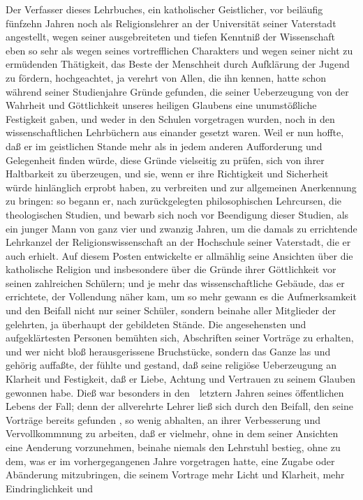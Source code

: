 \def\dieserteilseiten{I}%
\def\dieserteil{I}%
\RWch*{Vorrede.[uns
\RWSeitenwohne{III}\\
{\normalsize \protect\vorredekennzeichnung}}%
%
%
\linenumbers\noindent Der Verfasser dieses Lehrbuches, ein katholischer Geistlicher, vor beiläufig fünfzehn Jahren noch als Religionslehrer an der Universität seiner Vaterstadt angestellt, wegen seiner ausgebreiteten und tiefen Kenntniß der Wissenschaft eben so sehr als wegen seines vortrefflichen Charakters und wegen seiner nicht zu ermüdenden Thätigkeit, das Beste der Menschheit durch Aufklärung der Jugend zu fördern, hochgeachtet, ja verehrt von Allen, die ihn kennen, hatte schon während seiner Studienjahre Gründe gefunden, die seiner Ueberzeugung von der Wahrheit und Göttlichkeit unseres heiligen Glaubens eine unumstößliche Festigkeit gaben, und weder in den Schulen vorgetragen wurden, noch in den wissenschaftlichen Lehrbüchern aus einander gesetzt waren. Weil er nun hoffte, daß er im geistlichen Stande mehr als in jedem anderen Aufforderung und Gelegenheit finden würde, diese Gründe vielseitig zu prüfen, sich von ihrer Haltbarkeit zu überzeugen, und sie, wenn er ihre Richtigkeit und Sicherheit würde hinlänglich erprobt haben, zu verbreiten und zur allgemeinen Anerkennung zu bringen: so begann er, nach zurückgelegten philosophischen Lehrcursen, die theologischen Studien, und bewarb sich noch vor Beendigung dieser Studien, als ein junger Mann von  ganz vier und zwanzig Jahren, um die damals zu errichtende Lehrkanzel der Religionswissenschaft an der Hochschule seiner Vaterstadt, die er auch erhielt. Auf diesem Posten entwickelte er allmählig seine Ansichten über die katholische Religion und insbesondere über die Gründe ihrer Göttlichkeit vor seinen zahlreichen Schülern; und je mehr das wissenschaftliche Gebäude, das er errichtete, der Vollendung näher kam, um so mehr gewann es die Aufmerksamkeit und den Beifall nicht nur seiner Schüler, sondern beinahe aller Mitglieder der gelehrten, ja überhaupt der gebildeten Stände. Die angesehensten und aufgeklärtesten Personen bemühten sich, Abschriften seiner Vorträge zu erhalten, und wer nicht bloß herausgerissene Bruchstücke, sondern das Ganze las und gehörig auffaßte, der fühlte und gestand, daß seine religiöse Ueberzeugung an Klarheit und Festigkeit, daß er Liebe, Achtung und Vertrauen zu seinem Glauben gewonnen habe. Dieß war besonders in den~\ letztern Jahren seines öffentlichen Lebens der Fall; denn der allverehrte Lehrer ließ sich durch den Beifall, den seine Vorträge bereits gefunden , so wenig abhalten, an ihrer Verbesserung und Vervollkommnung zu arbeiten, daß er vielmehr, ohne in dem  seiner Ansichten eine Aenderung vorzunehmen, beinahe niemals den Lehrstuhl bestieg, ohne zu dem, was er im vorhergegangenen Jahre vorgetragen hatte, eine Zugabe oder Abänderung mitzubringen, die seinem Vortrage mehr Licht und Klarheit, mehr Eindringlichkeit und 